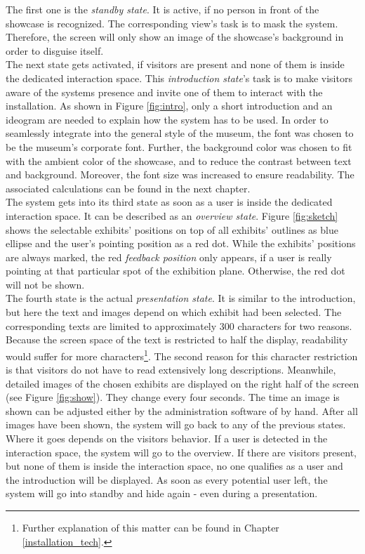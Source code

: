 The first one is the \textit{standby state}. It is active, if no person in front of the showcase is recognized. The corresponding view's task is to mask the system. Therefore, the screen will only show an image of the showcase's background in order to disguise itself. 
\\
The next state gets activated, if visitors are present and none of them is inside the dedicated interaction space. This \textit{introduction state}'s task is to make visitors aware of the systems presence and invite one of them to interact with the installation. As shown in Figure \ref{fig:intro}, only a short introduction and an ideogram are needed to explain how the system has to be used. In order to seamlessly integrate into the general style of the museum, the font was chosen to be the museum's corporate font. Further, the background color was chosen to fit with the ambient color of the showcase, and to reduce the contrast between text and background. Moreover, the font size was increased to ensure readability. The associated calculations can be found in the next chapter. 
\\
The system gets into its third state as soon as a user is inside the dedicated interaction space. It can be described as an \textit{overview state}. Figure \ref{fig:sketch} shows the selectable exhibits' positions on top of all exhibits' outlines as blue ellipse and the user's pointing position as a red dot. While the exhibits' positions are always marked, the red \textit{feedback position} only appears, if a user is really pointing at that particular spot of the exhibition plane. Otherwise, the red dot will not be shown.
\\
The fourth state is the actual \textit{presentation state}. It is similar to the introduction, but here the text and images depend on which exhibit had been selected. The corresponding texts are limited to approximately 300 characters for two reasons. Because the screen space of the text is restricted to half the display, readability would suffer for more characters\footnote{Further explanation of this matter can be found in Chapter \ref{installation_tech}.}. The second reason for this character restriction is that visitors do not have to read extensively long descriptions. Meanwhile, detailed images of the chosen exhibits are displayed on the right half of the screen (see Figure \ref{fig:show}). They change every four seconds. The time an image is shown can be adjusted either by the administration software of by hand. After all images have been shown, the system will go back to any of the previous states. Where it goes depends on the visitors behavior. If a user is detected in the interaction space, the system will go to the overview. If there are visitors present, but none of them is inside the interaction space, no one qualifies as a user and the introduction will be displayed. As soon as every potential user left, the system will go into standby and hide again - even during a presentation.

